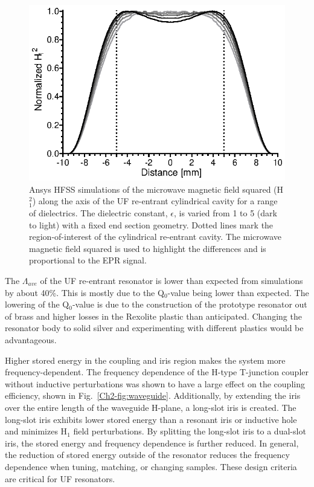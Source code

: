 \begin{figure}[htb]\centering
 \includegraphics{Kapitel/Ch2-Images/07-TE01UdielectircA.eps}
 \caption[Ansys HFSS simulations of with varying samples.]{Ansys HFSS simulations of the microwave magnetic field squared (H$^2_1$) along the axis of the UF re-entrant cylindrical \cylTE{} cavity for a range of dielectrics. The dielectric constant, $\epsilon$, is varied from 1 to 5 (dark to light) with a fixed end section geometry. Dotted lines mark the region-of-interest of the cylindrical re-entrant \cylTE{} cavity.  The microwave magnetic field squared is used to highlight the differences and is proportional to the EPR signal. }
 \label{Ch2-fig:dielectric}
\end{figure}

The $\Lambda_{ave}$ of the UF re-entrant \cylTE{} resonator is lower than expected from simulations by about 40\%. This is mostly due to the Q$_0$-value being lower than expected. The lowering of the Q$_0$-value is due to the construction of the prototype resonator out of brass and higher losses in the Rexolite plastic than anticipated. Changing the resonator body to solid silver and experimenting with different plastics would be advantageous. 

Higher stored energy in the coupling and iris region makes the system more frequency-dependent. The frequency dependence of the H-type T-junction coupler without inductive perturbations was shown to have a large effect on the coupling efficiency, shown in Fig.~\ref{Ch2-fig:waveguide}. Additionally, by extending the iris over the entire length of the waveguide H-plane, a long-slot iris is created. \cite{Mett2009} The long-slot iris exhibits lower stored energy than a resonant iris or inductive hole and minimizes H$_1$ field perturbations. By splitting the long-slot iris to a dual-slot iris, the stored energy and frequency dependence is further reduced. In general, the reduction of stored energy outside of the resonator reduces the frequency dependence when tuning, matching, or changing samples. These design criteria are critical for UF resonators. 

